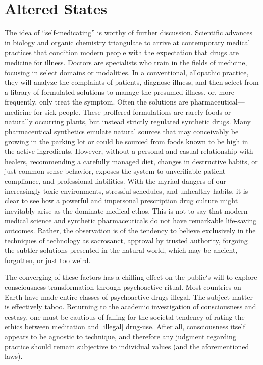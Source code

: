 \documentclass{UIdahoMastersThesis}
\begin{document}
\section{Altered States}


The idea of ``self-medicating'' is worthy of further discussion. Scientific advances in biology and organic chemistry triangulate to arrive at contemporary medical practices that condition modern people with the expectation that drugs are medicine for illness. Doctors are specialists who train in the fields of medicine, focusing in select domains or modalities. In a conventional, allopathic practice, they will analyze the complaints of patients, diagnose illness, and then select from a library of formulated solutions to manage the presumed illness, or, more frequently, only treat the symptom. Often the solutions are pharmaceutical---medicine for sick people. These proffered formulations are rarely foods or naturally occurring plants, but instead strictly regulated synthetic drugs. Many pharmaceutical synthetics emulate natural sources that may conceivably be growing in the parking lot or could be sourced from foods known to be high in the active ingredients. However, without a personal and casual relationship with healers, recommending a carefully managed diet, changes in destructive habits, or just common-sense behavior, exposes the system to unverifiable patient compliance, and professional liabilities. With the myriad dangers of our increasingly toxic environments, stressful schedules, and unhealthy habits, it is clear to see how a powerful and impersonal prescription drug culture might inevitably arise as the dominate medical ethos. This is not to say that modern medical science and synthetic pharmaceuticals do not have remarkable life-saving outcomes. Rather, the observation is of the tendency to believe exclusively in the techniques of technology as sacrosanct, approval by trusted authority, forgoing the subtler solutions presented in the natural world, which may be ancient, forgotten, or just too weird.

The converging of these factors has a chilling effect on the public`s will to explore consciousness transformation through psychoactive ritual. Most countries on Earth have made entire classes of psychoactive drugs illegal. The subject matter is effectively taboo. Returning to the academic investigation of consciousness and ecstasy, one must be cautious of falling for the societal tendency of rating the ethics between meditation and [illegal] drug-use. After all, consciousness itself appears to be agnostic to technique, and therefore any judgment regarding practice should remain subjective to individual values (and the aforementioned laws).
\end{document}
